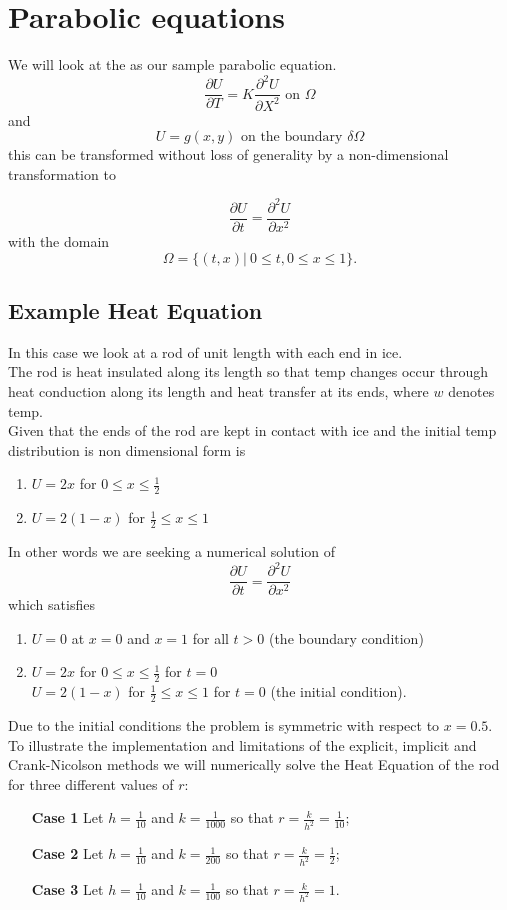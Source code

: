 \chapter{Parabolic equations}
We will look at the  as our sample parabolic equation.
\[ \frac{\partial U}{\partial T}=K\frac{\partial^2U }{\partial X^2} \mbox{ on } \Omega \]
and 
\[ U=g(x,y) \mbox{ on the boundary } \delta\Omega \]
this can be transformed without loss of generality by a non-dimensional transformation to

\begin{equation}\label{heat} \frac{\partial U}{\partial t}=\frac{\partial^2U }{\partial x^2}\end{equation}
with the domain
\[\Omega=\{(t,x)| \ 0\leq t, 0 \leq x \leq 1\}. \]

\section{Example Heat Equation} 
In this case we look at a rod of unit length with each end in ice.\\
The rod is heat insulated along its length so that temp changes occur through
heat conduction along its length and heat transfer at its ends, where $w$ denotes
temp.\\
Given that the ends of the rod are kept in contact with ice and the initial temp
distribution is non dimensional form is
\begin{enumerate}
\item $U=2x$ for $0\leq x \leq \frac{1}{2}$ 
\item $U=2(1-x)$ for $\frac{1}{2}\leq x \leq 1$ 
\end{enumerate}
In other words we are seeking a numerical solution of
\[\frac{\partial U}{\partial t}=\frac{\partial^2U }{\partial x^2}\]
which satisfies
\begin{enumerate}
\item $U=0$ at $x=0$ and $x=1$ for all $t>0$ (the boundary condition)
\item $U=2x$ for $0\leq x \leq \frac{1}{2}$ for $t=0$\\
$U=2(1-x)$ for $\frac{1}{2}\leq x \leq 1$ for $t=0$ (the initial condition).
\end{enumerate}
Due to the initial conditions the problem is symmetric with respect to $x=0.5.$ 
To illustrate the implementation and limitations of the explicit, implicit and Crank-Nicolson methods we will numerically solve the Heat Equation of the rod for three different values of $r$:
\begin{enumerate}
\item[\textbf{Case 1}]
Let $h=\frac{1}{10}$ and $k=\frac{1}{1000}$ so that $r=\frac{k}{h^2}=\frac{1}{10}$;
\item[\textbf{Case 2}]
Let $h=\frac{1}{10}$ and $k=\frac{1}{200}$ so that $r=\frac{k}{h^2}=\frac{1}{2}$;
\item[\textbf{Case 3}]
Let $h=\frac{1}{10}$ and $k=\frac{1}{100}$ so that $r=\frac{k}{h^2}=1$.
\end{enumerate}


